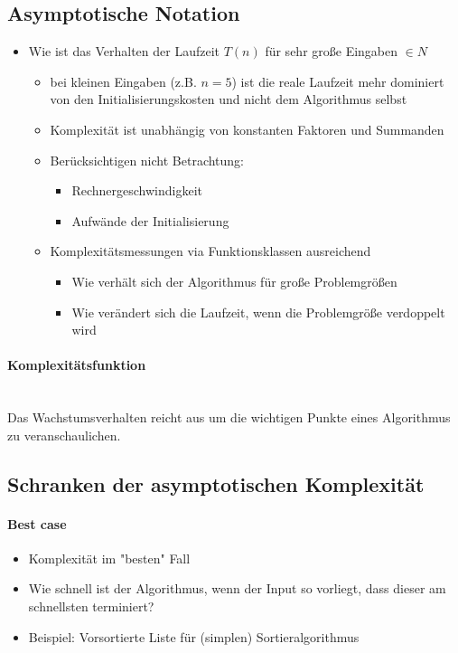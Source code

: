 	\subsection{Asymptotische Notation}
	\begin{itemize}
		\item Wie ist das Verhalten der Laufzeit $T(n)$ für sehr gro\ss e Eingaben $  \in N$
		\begin{itemize}
			\item bei kleinen Eingaben (z.B. $n = 5$) ist die reale Laufzeit mehr dominiert 
				von den Initialisierungskosten und nicht dem Algorithmus selbst
			\item Komplexität ist unabhängig von konstanten Faktoren und Summanden
			\item Berücksichtigen nicht Betrachtung:
			\begin{itemize}
				\item Rechnergeschwindigkeit
				\item Aufwände der Initialisierung
			\end{itemize}
			\item Komplexitätsmessungen via Funktionsklassen ausreichend
			\begin{itemize}
				\item Wie verhält sich der Algorithmus für gro\ss e Problemgrö\ss en
				\item Wie verändert sich die Laufzeit, wenn die Problemgrö\ss e verdoppelt wird
			\end{itemize}
		\end{itemize}
	\end{itemize}

	\paragraph{Komplexitätsfunktion} \mbox{} \\
	Das Wachstumsverhalten reicht aus um die wichtigen Punkte eines Algorithmus zu veranschaulichen.

	\subsection{Schranken der asymptotischen Komplexität}
	\paragraph{Best case}
	\begin{itemize}
		\item Komplexität im "besten" Fall
		\item Wie schnell ist der Algorithmus, wenn der Input so vorliegt, dass dieser am schnellsten terminiert?
		\item Beispiel: Vorsortierte Liste für (simplen) Sortieralgorithmus
	\end{itemize}
